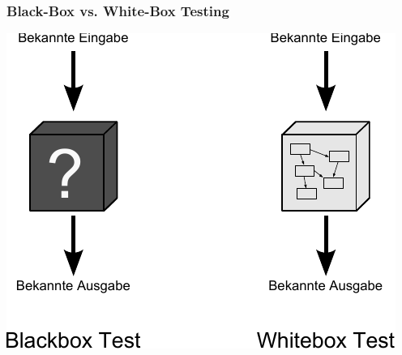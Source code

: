 
\begin{frame}
\frametitle{Black-Box vs. White-Box Testing}
  \begin{center}
  \includegraphics[width=.8\textwidth]{images/Qualitaetssicherung/abbildungen/BlackBoxAndWhiteBoxTesting}
  \end{center}
\end{frame}

